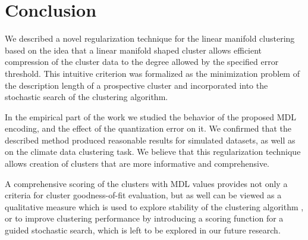 \section{Conclusion}
\label{sc:conclusion}

We described a novel regularization technique for the linear manifold clustering
based on the idea that a linear manifold shaped cluster allows efficient compression
of the cluster data to the degree allowed by the specified error threshold.
This intuitive criterion was formalized as the minimization problem of
the description length of a prospective cluster and incorporated into
the stochastic search of the clustering algorithm.

In the empirical part of the work we studied the behavior of the proposed MDL
encoding, and the effect of the quantization error on it. We confirmed that
the described method produced reasonable results for simulated datasets, as
well as on the climate data clustering task. We believe that this regularization
technique allows creation of clusters that are more informative and
comprehensive.

A comprehensive scoring of the clusters with MDL values provides not only a
criteria for cluster goodness-of-fit evaluation, but as well can be viewed as
a qualitative measure which is used to explore stability of the clustering
algorithm \cite{VonLuxburg:2005VB}, or to improve clustering performance by
introducing a scoring function for a guided stochastic search, which is left to
be explored in our future research.